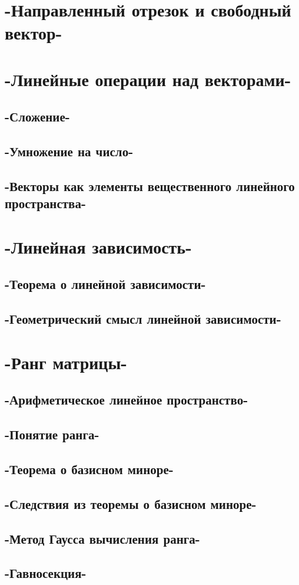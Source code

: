\chapter{-Направленный отрезок и свободный вектор-}
\chapter{-Линейные операции над векторами-}
\section{-Сложение-}
\section{-Умножение на число-}
\section{-Векторы как элементы вещественного линейного пространства-}
\chapter{-Линейная зависимость-}
\section{-Теорема о линейной зависимости-}
\section{-Геометрический смысл линейной зависимости-}
\chapter{-Ранг матрицы-}
\section{-Арифметическое линейное пространство-}
\section{-Понятие ранга-}
\section{-Теорема о базисном миноре-}
\section{-Следствия из теоремы о базисном миноре-}
\section{-Метод Гаусса вычисления ранга-}
\section{-Гавносекция-}
